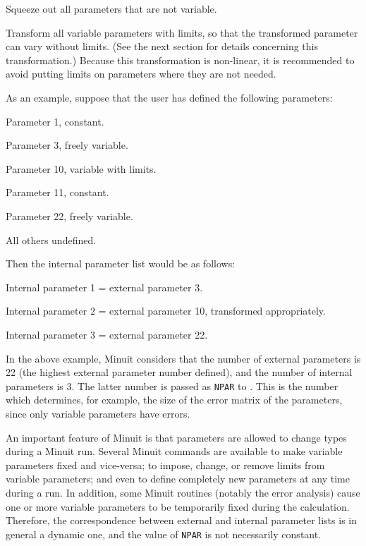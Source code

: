 \begin{OL}
\item Squeeze out all parameters that are not variable.
\item Transform all variable parameters with limits, so that the transformed
      parameter can vary without limits.
      (See the next section for details concerning this transformation.)
      Because this transformation is non-linear, it is recommended to avoid
      putting limits on parameters where they are not needed.
\end{OL}

As an example, suppose that the user has defined the following parameters:
\begin{UL}
\item Parameter 1, constant.
\item Parameter 3, freely variable.
\item Parameter 10, variable with limits.
\item Parameter 11, constant.
\item Parameter 22, freely variable.
\item All others undefined.
\end{UL}
Then the internal parameter list would be as follows:
\begin{UL}
\item Internal parameter 1 = external parameter 3.
\item Internal parameter 2 = external parameter 10, transformed appropriately.
\item Internal parameter 3 = external parameter 22.
\end{UL}
In the above example, Minuit considers that the number of external parameters
is 22 (the highest external parameter number defined), and the number of
internal parameters is 3.  The latter number is passed as \texttt{NPAR} to .
This is the number which determines, for example, the size of the error matrix
of the parameters, since only variable parameters have errors.
 
An important feature of Minuit is that parameters are allowed to change
types during a Minuit run. Several Minuit commands are available to make
variable parameters fixed and vice-versa; to impose, change, or remove limits
from variable parameters; and even to define completely new parameters at any
time during a run. In addition, some Minuit routines (notably the  error
analysis) cause one or more variable parameters to be temporarily fixed during
the calculation.  Therefore, the correspondence between external and internal
parameter lists is in general a dynamic one, and the value of \texttt{NPAR} is not
necessarily constant.

